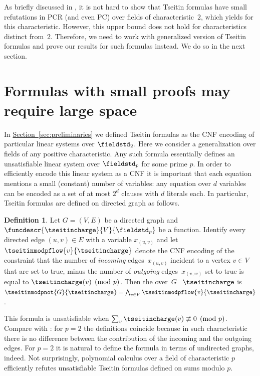 \documentclass[11pt]{article}
\numberwithin{equation}{section}
\theoremstyle{definition}
\newtheorem{definition}[theorem]{Definition}
\theoremstyle{plain}
\newcommand{\expref}[2]{\hyperref[#2]{#1~\ref{#2}}}
\begin{document}
As briefly discussed in 
, 
it is not hard to show that Tseitin formulas have small 
refutations in PCR (and even PC) over fields of characteristic~$2$,
which yields
for this characteristic. 
However, this upper bound does not hold for characteristics distinct
from~$2$. 
%
Therefore, we need to work with generalized version of Tseitin formulas
and prove our results for such formulas instead. We do so in the next section.
%

\section{Formulas with small proofs may require large space}
\label{sec:tseitinseparation}

In \expref{Section}{sec:preliminaries} we defined Tseitin formulas as the
CNF encoding of particular linear systems over $\fieldstd_{2}$.  Here we
consider a generalization over fields of any positive characteristic.
%
Any such formula essentially defines an unsatisfiable linear system over
$\fieldstd_{p}$ for some prime $p$. In order to efficiently encode this
linear system as a CNF it is important that each equation mentions a
small (\egComma constant) number of variables: any equation over $d$
variables can be encoded as a set of at most $2^{d}$ clauses with $d$
literals each.  In particular, Tseitin formulas are defined on
directed graph as follows.

\begin{definition}\label{def:tseitinmodp}
  Let $G = (V,E)$ be a directed graph and
  $\funcdescr{\tseitincharge}{V}{\fieldstd_p}$
  be a function.
  Identify every directed edge $(u,v) \in E$ with a variable $x_{(u,v)}$
  and  let
  $\tseitinmodpflow{v}{\tseitincharge}$
  denote the CNF encoding
  of the constraint
  that the number of \emph{incoming} edges~$x_{(u,v)}$ incident to a vertex $v \in V$ that are set to true, minus the number of \emph{outgoing} edges~$x_{(v,w)}$ set to true is equal to $\tseitincharge(v) \pmod{p}$.
  Then the  over~$G$ \wrt{}~$\tseitincharge$
  is $\tseitinmodpnot{G}{\tseitincharge}=
  \bigwedge_{v\in V}\tseitinmodpflow{v}{\tseitincharge}$.
\end{definition}

This formula is unsatisfiable when $\sum_{v}\tseitincharge(v)\not\equiv 0
\pmod{p}$. Compare  with
: for $p=2$ the definitions
coincide because in such characteristic there is no difference
between the contribution of the incoming and the outgoing edges. For
$p=2$ it is natural to define the formula in terms of undirected
graphs, indeed.
%
Not surprisingly, polynomial calculus over a field of characteristic
$p$ efficiently refutes unsatisfiable Tseitin formulas defined on
sums modulo $p$.
\end{document}
